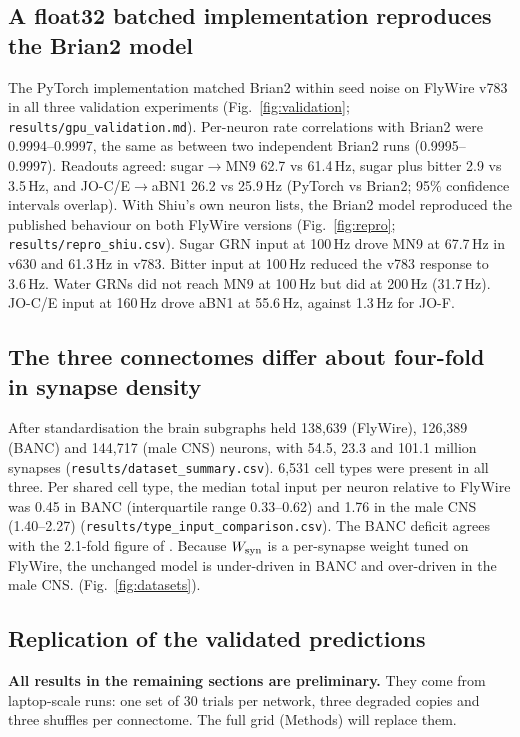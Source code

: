 
\subsection*{A float32 batched implementation reproduces the Brian2 model}
The PyTorch implementation matched Brian2 within seed noise on FlyWire v783 in all three
validation experiments (Fig.~\ref{fig:validation}; \texttt{results/gpu\_validation.md}).
Per-neuron rate correlations with Brian2 were 0.9994--0.9997, the same as between two
independent Brian2 runs (0.9995--0.9997). Readouts agreed: sugar$\to$MN9 62.7 vs 61.4\,Hz,
sugar plus bitter 2.9 vs 3.5\,Hz, and JO-C/E$\to$aBN1 26.2 vs 25.9\,Hz (PyTorch vs Brian2;
95\% confidence intervals overlap). 
With Shiu's own neuron lists, the Brian2 model reproduced the published behaviour on both
FlyWire versions (Fig.~\ref{fig:repro}; \texttt{results/repro\_shiu.csv}). Sugar GRN input at
100\,Hz drove MN9 at 67.7\,Hz in v630 and 61.3\,Hz in v783. Bitter input at 100\,Hz reduced
the v783 response to 3.6\,Hz. Water GRNs did not reach MN9 at 100\,Hz but did at 200\,Hz
(31.7\,Hz). JO-C/E input at 160\,Hz drove aBN1 at 55.6\,Hz, against 1.3\,Hz for JO-F.

\subsection*{The three connectomes differ about four-fold in synapse density}
After standardisation the brain subgraphs held 138{,}639 (FlyWire), 126{,}389 (BANC) and
144{,}717 (male CNS) neurons, with 54.5, 23.3 and 101.1 million synapses
(\texttt{results/dataset\_summary.csv}). 6{,}531 cell types were present in all three. Per
shared cell type, the median total input per neuron relative to FlyWire was 0.45 in BANC
(interquartile range 0.33--0.62) and 1.76 in the male CNS (1.40--2.27)
(\texttt{results/type\_input\_comparison.csv}). The BANC deficit agrees with the 2.1-fold
figure of \citep{santos2026}. Because $W_{\mathrm{syn}}$ is a per-synapse weight tuned on FlyWire, the
unchanged model is under-driven in BANC and over-driven in the male CNS. (Fig.~\ref{fig:datasets}).

\subsection*{Replication of the validated predictions}
\textbf{All results in the remaining sections are preliminary.} They come from laptop-scale
runs: one set of 30 trials per network, three degraded copies and three shuffles per
connectome. The full grid (Methods) will replace them. 

